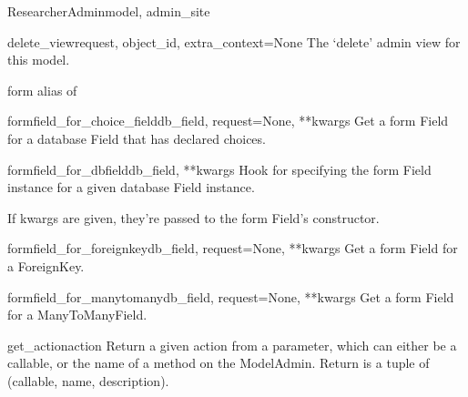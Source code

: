 \documentclass[letterpaper,10pt,english]{sphinxmanual}
\begin{document}
\begin{classdesc}{ResearcherAdmin}{model, admin\_site}
\hypertarget{data.admin.ResearcherAdmin.delete_view}{}\begin{methoddesc}{delete\_view}{request, object\_id, extra\_context=None}
The `delete' admin view for this model.
\end{methoddesc}

\hypertarget{data.admin.ResearcherAdmin.form}{}\begin{memberdesc}{form}
alias of 
\end{memberdesc}

\hypertarget{data.admin.ResearcherAdmin.formfield_for_choice_field}{}\begin{methoddesc}{formfield\_for\_choice\_field}{db\_field, request=None, **kwargs}
Get a form Field for a database Field that has declared choices.
\end{methoddesc}

\hypertarget{data.admin.ResearcherAdmin.formfield_for_dbfield}{}\begin{methoddesc}{formfield\_for\_dbfield}{db\_field, **kwargs}
Hook for specifying the form Field instance for a given database Field
instance.

If kwargs are given, they're passed to the form Field's constructor.
\end{methoddesc}

\hypertarget{data.admin.ResearcherAdmin.formfield_for_foreignkey}{}\begin{methoddesc}{formfield\_for\_foreignkey}{db\_field, request=None, **kwargs}
Get a form Field for a ForeignKey.
\end{methoddesc}

\hypertarget{data.admin.ResearcherAdmin.formfield_for_manytomany}{}\begin{methoddesc}{formfield\_for\_manytomany}{db\_field, request=None, **kwargs}
Get a form Field for a ManyToManyField.
\end{methoddesc}

\hypertarget{data.admin.ResearcherAdmin.get_action}{}\begin{methoddesc}{get\_action}{action}
Return a given action from a parameter, which can either be a callable,
or the name of a method on the ModelAdmin.  Return is a tuple of
(callable, name, description).
\end{methoddesc}


\end{classdesc}
\end{document}
